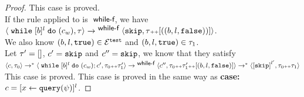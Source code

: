 \begin{proof}
		This case is proved.
		\\
		If the rule applied to is $\textsf{\small{ while-f}}$, we have
		\\
		$
		{
			\langle {\;\ensuremath{\mathtt{while}}\;[b]^{l} \;\ensuremath{\mathtt{do}}\;(c_w), \ensuremath{\mathtt{\tau}}} \rangle
			\xrightarrow{}^{\textsf{\small{ while-f}}}
			\langle {
			\ensuremath{\mathtt{skip}},
			\ensuremath{\mathtt{\tau}}{\scriptscriptstyle ++}[((b, l, \ensuremath{\mathtt{false}}))]} \rangle
		}$.\\
		We also know
		$(b, l, \mathtt{true}) \in \mathcal{E}^{\mathtt{{test}}}$ and $(b, l, \mathtt{true}) \in \mathtt{\tau}_1$.
		\\
		Let $\mathtt{\tau}' = []$, $c' = \mathtt{skip}$ and $c'' = \mathtt{skip}$, we know that they satisfy
		\\
		$\config{c, \trace_0} \rightarrow^* 
		\config{ \ewhile [b]^{l} \edo (c_w);c', \trace_0 \tracecat  \trace_1'} 
		\rightarrow^\rname{while-f}
		\config{c'', \trace_0 \tracecat \trace_1'\tracecat [(b, l, \efalse)] } \rightarrow^{*}
		\config{ \clabel{\eskip}^{l'}, \trace_0  \tracecat \trace_1}$
		\\
		This case is proved.
		This case is proved in the same way as \textbf{case: $c = [\mathrel{ x \leftarrow {\tt query}(\psi) }]^l$}.
	\end{proof}


